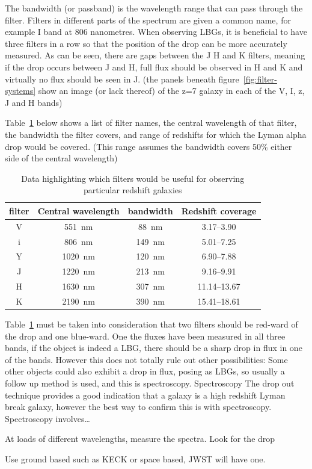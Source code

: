 		The bandwidth (or passband) is the wavelength range that can pass through the filter. Filters in different parts of the spectrum are given a common name, for example I band at 806 nanometres. When observing LBGs, it is beneficial to have three filters in a row so that the position of the drop can be more accurately measured. As can be seen, there are gaps between the J H and K filters, meaning if the drop occurs between J and H, full flux should be observed in H and K and virtually no flux should be seen in J. (the panels beneath figure~\ref{fig:filter-systems} show an image (or lack thereof) of the z=7 galaxy in each of the V, I, z, J and H bands)

		Table~\ref{tab:filter_characteristics} below shows a list of filter names, the central wavelength of that filter, the bandwidth the filter covers, and range of redshifts for which the Lyman alpha drop would be covered. (This  range assumes the bandwidth covers 50\% either side of the central wavelength)
		\begin{table}[ht]
			\begin{center}
				\begin{tabular}{c|c|c|c}
					filter 	& Central wavelength & bandwidth & Redshift coverage \\
					\hline \hline
					V 	& \SI{551}{\nano\meter}	 & \SI{88}{\nano\meter} & 3.17--3.90 \\
					i 	& \SI{806}{\nano\meter}	 & \SI{149}{\nano\meter} & 5.01--7.25 \\
					Y 	& \SI{1020}{\nano\meter} & \SI{120}{\nano\meter} & 6.90--7.88 \\
					J 	& \SI{1220}{\nano\meter} & \SI{213}{\nano\meter} & 9.16--9.91 \\
					H 	& \SI{1630}{\nano\meter} & \SI{307}{\nano\meter} & 11.14--13.67 \\
					K 	& \SI{2190}{\nano\meter} & \SI{390}{\nano\meter} & 15.41--18.61
				\end{tabular}
			\end{center}
			\caption{Data highlighting which filters would be useful for observing particular redshift galaxies\cite{Galactic_Astronomy_Binney_Merrifield}}
			\label{tab:filter_characteristics}
		\end{table}

		Table~\ref{tab:filter_characteristics} must be taken into consideration that two filters should be red-ward of the drop and one blue-ward. One the fluxes have been measured in all three bands, if the object is indeed a LBG, there should be a sharp drop in flux in  one of the bands. However this does not totally rule out other possibilities: Some other objects could also exhibit a drop in flux, posing as LBGs, so usually a follow up method is used, and this is spectroscopy. Spectroscopy The drop out technique provides a good indication that a galaxy is a high redshift Lyman break galaxy, however the best way to confirm this is with spectroscopy. Spectroscopy involves\ldots

		At loads of different wavelengths, measure the spectra. Look for the drop
		 
		Use ground based such as KECK or space based, JWST will have one.


